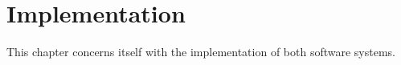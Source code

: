 \chapter{Implementation}\label{ch:implementation}

This chapter concerns itself with the implementation of both software systems.



